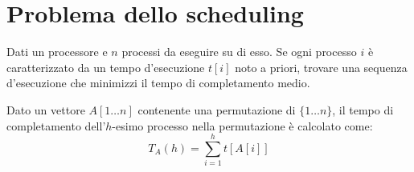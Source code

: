 \section{Problema dello scheduling}
\begin{problem}
    Dati un processore e $n$ processi da eseguire su di esso. Se ogni processo $i$
    è caratterizzato da un tempo d'esecuzione $t[i]$ noto a priori, trovare una
    sequenza d'esecuzione che minimizzi il tempo di completamento medio.
\end{problem}
\begin{definition}
    Dato un vettore $A[1\dots n]$ contenente una permutazione di $\{1\dots n\}$,
    il tempo di completamento dell'$h$-esimo processo nella permutazione è
    calcolato come:
    \[T_A(h)=\sum_{i=1}^h t[A[i]]\]
\end{definition}

